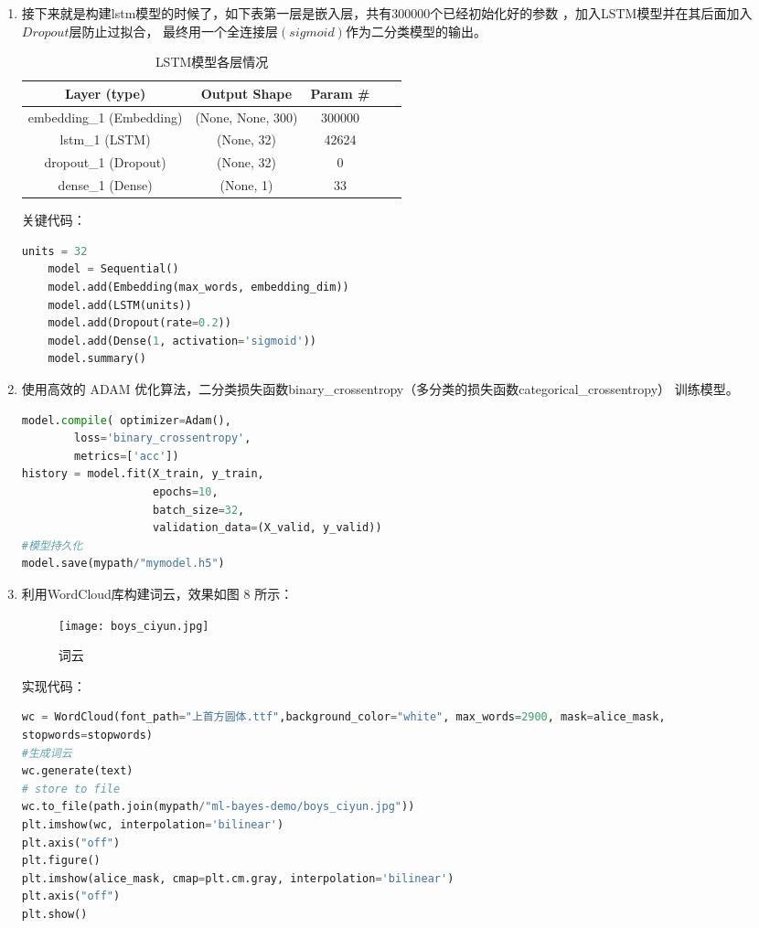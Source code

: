 \documentclass[withoutpreface,bwprint]{cumcmthesis} %
\begin{document}
\begin{enumerate}
\item 接下来就是构建lstm模型的时候了，如下表第一层是嵌入层，共有300000个已经初始化好的参数
，加入LSTM模型并在其后面加入$Dropout$层防止过拟合，
最终用一个全连接层$(sigmoid)$作为二分类模型的输出。
\begin{table}[!htbp]
    \caption{LSTM模型各层情况}\label{tab:002} \centering
    \begin{tabular}{ccccc}
        \toprule[1.5pt]
        Layer (type)&Output Shape&Param \# \\
        \midrule[1pt]
        embedding\_1 (Embedding)   &   (None, None, 300)  &       300000   \\ 
        lstm\_1 (LSTM)          &      (None, 32)         &       42624          \\ 
        dropout\_1 (Dropout)    &      (None, 32)         &       0        \\ 
        dense\_1 (Dense)        &      (None, 1)          &       33 \\
        \bottomrule[1.5pt]
    \end{tabular}
\end{table}

关键代码：
\begin{lstlisting}[language=python]
    units = 32
    model = Sequential()
    model.add(Embedding(max_words, embedding_dim))
    model.add(LSTM(units))
    model.add(Dropout(rate=0.2))
    model.add(Dense(1, activation='sigmoid'))
    model.summary()
        \end{lstlisting}

\item 使用高效的 ADAM 优化算法，二分类损失函数binary\_crossentropy（多分类的损失函数categorical\_crossentropy）
训练模型。
\begin{lstlisting}[language=python]
model.compile( optimizer=Adam(),
        loss='binary_crossentropy',
        metrics=['acc'])
history = model.fit(X_train, y_train,
                    epochs=10,
                    batch_size=32,
                    validation_data=(X_valid, y_valid))
#模型持久化
model.save(mypath/"mymodel.h5")
        \end{lstlisting}

\item 利用WordCloud库构建词云，效果如图 8 所示：
\begin{figure}[H]
    \centering
    \texttt{[image: boys\_ciyun.jpg]}
    \caption{词云}
\end{figure}

实现代码：
\begin{lstlisting}[language=python]
wc = WordCloud(font_path="上首方圆体.ttf",background_color="white", max_words=2900, mask=alice_mask,
stopwords=stopwords)
#生成词云
wc.generate(text)
# store to file
wc.to_file(path.join(mypath/"ml-bayes-demo/boys_ciyun.jpg"))
plt.imshow(wc, interpolation='bilinear')
plt.axis("off")
plt.figure()
plt.imshow(alice_mask, cmap=plt.cm.gray, interpolation='bilinear')
plt.axis("off")
plt.show()
\end{lstlisting}
\end{enumerate}
\end{document}
